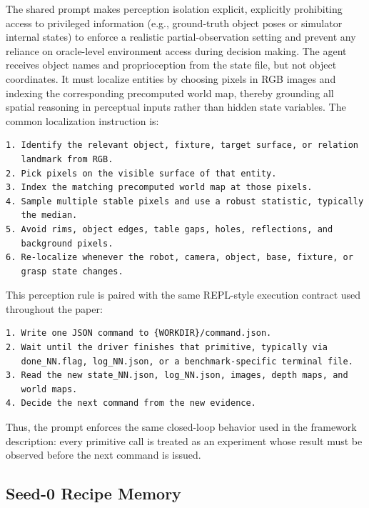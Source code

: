 \documentclass{article}
\begin{document}
The shared prompt makes perception isolation explicit, explicitly prohibiting access to privileged information (e.g., ground-truth object poses or simulator internal states) to enforce a realistic partial-observation setting and prevent any reliance on oracle-level environment access during decision making. The agent receives object names and proprioception from the state file, but not object coordinates. It must localize entities by choosing pixels in RGB images and indexing the corresponding precomputed world map, thereby grounding all spatial reasoning in perceptual inputs rather than hidden state variables. The common localization instruction is:


\begin{samepage}
\begin{lstlisting}[frame=single,framerule=0.5pt]
1. Identify the relevant object, fixture, target surface, or relation
   landmark from RGB.
2. Pick pixels on the visible surface of that entity.
3. Index the matching precomputed world map at those pixels.
4. Sample multiple stable pixels and use a robust statistic, typically
   the median.
5. Avoid rims, object edges, table gaps, holes, reflections, and
   background pixels.
6. Re-localize whenever the robot, camera, object, base, fixture, or
   grasp state changes.
\end{lstlisting}
\end{samepage}

This perception rule is paired with the same REPL-style execution contract used
throughout the paper:

\begin{samepage}
\begin{lstlisting}[frame=single,framerule=0.5pt]
1. Write one JSON command to {WORKDIR}/command.json.
2. Wait until the driver finishes that primitive, typically via
   done_NN.flag, log_NN.json, or a benchmark-specific terminal file.
3. Read the new state_NN.json, log_NN.json, images, depth maps, and
   world maps.
4. Decide the next command from the new evidence.
\end{lstlisting}
\end{samepage}

Thus, the prompt enforces the same closed-loop behavior used in the framework
description: every primitive call is treated as an experiment whose result must be
observed before the next command is issued.

\subsection{Seed-0 Recipe Memory}
\label{app:agent_prompt:recipe}
\end{document}
